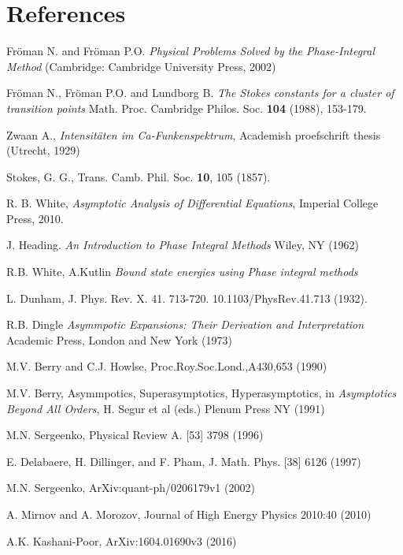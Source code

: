 \documentclass[12pt]{iopart}
\begin{document}
\section*{References}
\begin{thebibliography}{30}

 Fr\"oman N. and Fr\"oman P.O. \textit{Physical Problems Solved by the Phase-Integral Method} (Cambridge: Cambridge University Press, 2002)

 Fr\"oman N., Fr\"oman P.O. and Lundborg B. \textit{The Stokes constants for a cluster of transition
points} Math. Proc. Cambridge Philos. Soc. \textbf{104} (1988), 153-179.

 Zwaan A., \textit{Intensit\"aten im Ca-Funkenspektrum}, Academish proefschrift thesis (Utrecht, 1929)

 Stokes, G. G., Trans. Camb. Phil. Soc. \textbf{10}, 105 (1857).

 R. B. White,
 {\it Asymptotic Analysis of Differential Equations}, Imperial College Press, 2010.

 J. Heading. {\it An Introduction to Phase Integral Methods} 
Wiley, NY (1962)

 R.B. White, A.Kutlin {\it Bound state energies using Phase integral methods} 

 L. Dunham, J. Phys. Rev. X. 41. 713-720. 10.1103/PhysRev.41.713 (1932).
 
 R.B. Dingle {\it Asymmpotic Expansions: Their Derivation and 
Interpretation} Academic Press, London and New York (1973)

 M.V. Berry and C.J. Howlse, Proc.Roy.Soc.Lond.,A430,653 (1990)

 M.V. Berry, Asymmpotics, Superasymptotics,
 Hyperasymptotics, in {\it Asymptotics Beyond All Orders}, H. Segur et al (eds.) Plenum Press NY (1991)

 M.N. Sergeenko, Physical Review A. [53] 3798 (1996)

 E. Delabaere, H. Dillinger, and F. Pham, J. Math. Phys. [38] 6126 (1997)

 M.N. Sergeenko, ArXiv:quant-ph/0206179v1 (2002)

 A. Mirnov and A. Morozov, Journal of High Energy Physics 2010:40 (2010)

 A.K. Kashani-Poor, ArXiv:1604.01690v3 (2016)


\end{thebibliography}
\end{document}
